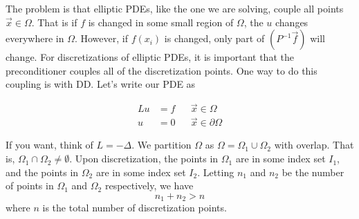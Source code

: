 The problem is that elliptic PDEs, like the one we are solving, couple all points $\vec{x}\in\Omega$. That is if $f$ is changed in some small region of $\Omega$, the $u$ changes everywhere in $\Omega$. However, if $f(x_i)$ is changed, only part of $\left(P^{-1}\vec{f}\right)$ will change. For discretizations of elliptic PDEs, it is important that the preconditioner couples all of the discretization points. One way to do this coupling is with DD. Let's write our PDE as

\begin{align*}
    Lu &=f &&\vec{x} \in \Omega \\
    u &= 0 &&\vec{x}\in \partial \Omega
\end{align*}

If you want, think of $L=-\Delta$. We partition $\Omega$ as $\Omega=\Omega_1 \cup \Omega_2$ with overlap. That is, $\Omega_1 \cap \Omega_2 \neq \emptyset$. Upon discretization, the points in $\Omega_1$ are in some index set $I_1$, and the points in $\Omega_2$ are in some index set $I_2$. Letting $n_1$ and $n_2$ be the number of points in $\Omega_1$ and $\Omega_2$ respectively, we have
\begin{equation*}
    n_1 + n_2 > n
\end{equation*}
where $n$ is the total number of discretization points.

